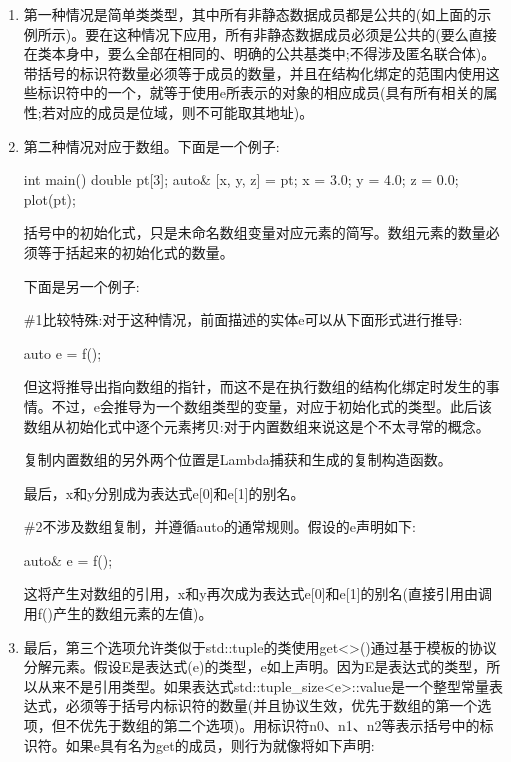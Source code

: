 \begin{enumerate}
\item
第一种情况是简单类类型，其中所有非静态数据成员都是公共的(如上面的示例所示)。要在这种情况下应用，所有非静态数据成员必须是公共的(要么直接在类本身中，要么全部在相同的、明确的公共基类中;不得涉及匿名联合体)。带括号的标识符数量必须等于成员的数量，并且在结构化绑定的范围内使用这些标识符中的一个，就等于使用e所表示的对象的相应成员(具有所有相关的属性;若对应的成员是位域，则不可能取其地址)。

\item
第二种情况对应于数组。下面是一个例子:

\begin{cpp}
int main() {
	double pt[3];
	auto& [x, y, z] = pt;
	x = 3.0; y = 4.0; z = 0.0;
	plot(pt);
}
\end{cpp}

括号中的初始化式，只是未命名数组变量对应元素的简写。数组元素的数量必须等于括起来的初始化式的数量。

下面是另一个例子:


\#1比较特殊:对于这种情况，前面描述的实体e可以从下面形式进行推导:

\begin{cpp}
auto e = f();
\end{cpp}

但这将推导出指向数组的指针，而这不是在执行数组的结构化绑定时发生的事情。不过，e会推导为一个数组类型的变量，对应于初始化式的类型。此后该数组从初始化式中逐个元素拷贝:对于内置数组来说这是个不太寻常的概念。

\begin{notice}复制内置数组的另外两个位置是Lambda捕获和生成的复制构造函数。
\end{notice}

最后，x和y分别成为表达式e[0]和e[1]的别名。

\#2不涉及数组复制，并遵循auto的通常规则。假设的e声明如下:

\begin{cpp}
auto& e = f();
\end{cpp}

这将产生对数组的引用，x和y再次成为表达式e[0]和e[1]的别名(直接引用由调用f()产生的数组元素的左值)。

\item
最后，第三个选项允许类似于std::tuple的类使用get<>()通过基于模板的协议分解元素。假设E是表达式(e)的类型，e如上声明。因为E是表达式的类型，所以从来不是引用类型。如果表达式std::tuple\_size<e>::value是一个整型常量表达式，必须等于括号内标识符的数量(并且协议生效，优先于数组的第一个选项，但不优先于数组的第二个选项)。用标识符n0、n1、n2等表示括号中的标识符。如果e具有名为get的成员，则行为就像将如下声明:


\end{enumerate}

